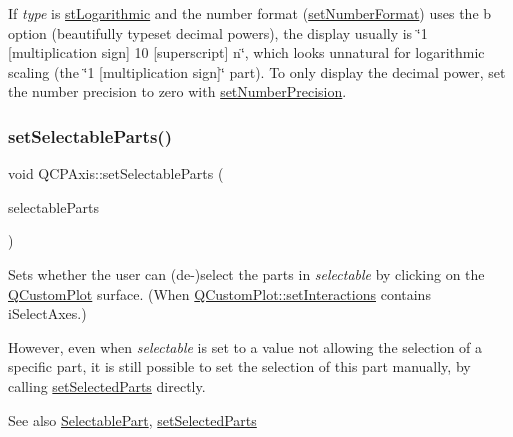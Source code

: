 If {\itshape type} is \mbox{\hyperlink{class_q_c_p_axis_a36d8e8658dbaa179bf2aeb973db2d6f0abf5b785ad976618816dc6f79b73216d4}{st\+Logarithmic}} and the number format (\mbox{\hyperlink{class_q_c_p_axis_ae585a54dc2aac662e90a2ca82f002590}{set\+Number\+Format}}) uses the \textquotesingle{}b\textquotesingle{} option (beautifully typeset decimal powers), the display usually is \char`\"{}1 \mbox{[}multiplication sign\mbox{]} 10
\mbox{[}superscript\mbox{]} n\char`\"{}, which looks unnatural for logarithmic scaling (the \char`\"{}1 \mbox{[}multiplication sign\mbox{]}\char`\"{} part). To only display the decimal power, set the number precision to zero with \mbox{\hyperlink{class_q_c_p_axis_a21dc8023ad7500382ad9574b48137e63}{set\+Number\+Precision}}. \mbox{\label{class_q_c_p_axis_a513f9b9e326c505d9bec54880031b085}} 
\subsubsection{\texorpdfstring{set\+Selectable\+Parts()}{setSelectableParts()}}
{\footnotesize\ttfamily void Q\+C\+P\+Axis\+::set\+Selectable\+Parts (\begin{DoxyParamCaption}\item[{const Q\+C\+P\+Axis\+::\+Selectable\+Parts \&}]{selectable\+Parts }\end{DoxyParamCaption})}

Sets whether the user can (de-\/)select the parts in {\itshape selectable} by clicking on the \mbox{\hyperlink{class_q_custom_plot}{Q\+Custom\+Plot}} surface. (When \mbox{\hyperlink{class_q_custom_plot_a5ee1e2f6ae27419deca53e75907c27e5}{Q\+Custom\+Plot\+::set\+Interactions}} contains i\+Select\+Axes.)

However, even when {\itshape selectable} is set to a value not allowing the selection of a specific part, it is still possible to set the selection of this part manually, by calling \mbox{\hyperlink{class_q_c_p_axis_ab9d7a69277dcbed9119b3c1f25ca19c3}{set\+Selected\+Parts}} directly.

\begin{DoxySeeAlso}{See also}
\mbox{\hyperlink{class_q_c_p_axis_abee4c7a54c468b1385dfce2c898b115f}{Selectable\+Part}}, \mbox{\hyperlink{class_q_c_p_axis_ab9d7a69277dcbed9119b3c1f25ca19c3}{set\+Selected\+Parts}} 
\end{DoxySeeAlso}
\mbox{\label{class_q_c_p_axis_aeb917a909215605b95ef2be843de1ee8}} 
